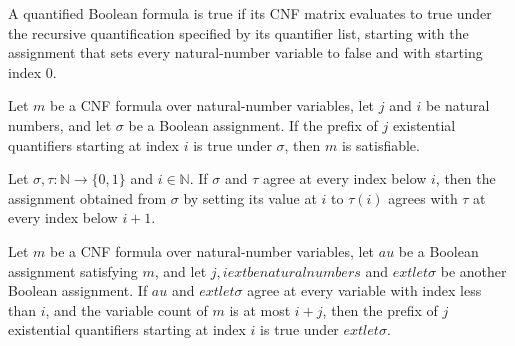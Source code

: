 \begin{definition}
\label{Complexity.QBF.truth}
\leanok
{}
A quantified Boolean formula is true if its CNF matrix evaluates to true under the
recursive quantification specified by its quantifier list, starting with the assignment
that sets every natural-number variable to false and with starting index $0$.
\end{definition}

\begin{theorem}
\label{Complexity.QBF.satisfiable_of_exPrefix}
\leanok
{}
Let $m$ be a CNF formula over natural-number variables, let $j$ and $i$ be natural
numbers, and let $\sigma$ be a Boolean assignment. If the prefix of $j$ existential
quantifiers starting at index $i$ is true under $\sigma$, then $m$ is satisfiable.
\end{theorem}

\begin{theorem}
\label{Complexity.QBF.update_prefix_agreement}
\leanok
{}
Let $\sigma,\tau:\mathbb{N}\to\{0,1\}$ and $i\in\mathbb{N}$. If $\sigma$ and $\tau$
agree at every index below $i$, then the assignment obtained from $\sigma$ by setting
its value at $i$ to $\tau(i)$ agrees with $\tau$ at every index below $i+1$.
\end{theorem}

\begin{theorem}
\label{Complexity.QBF.exPrefix_of_satisfying}
\leanok
{}
Let $m$ be a CNF formula over natural-number variables, let $	au$ be a Boolean
assignment satisfying $m$, and let $j,i	ext{ be natural numbers}$ and $	ext{ let }
\sigma$ be another Boolean assignment. If $	au$ and $	ext{ let }
\sigma$ agree at every variable with index less than $i$, and the variable count of $m$
is at most $i+j$, then the prefix of $j$ existential quantifiers starting at index $i$
is true under $	ext{ let }
\sigma$.
\end{theorem}


